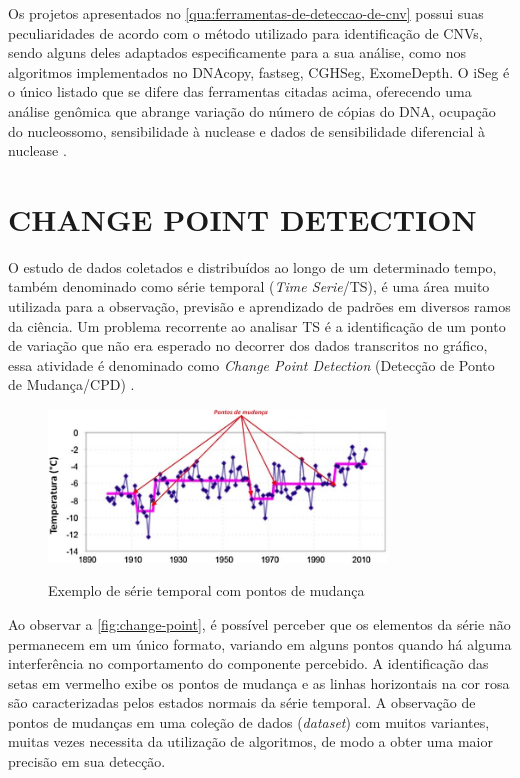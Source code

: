 Os projetos apresentados no \autoref{qua:ferramentas-de-deteccao-de-cnv} possui suas peculiaridades de acordo com o método utilizado para identificação de CNVs, sendo alguns deles adaptados especificamente para a sua análise, como nos algoritmos implementados no DNAcopy, fastseg, CGHSeg, ExomeDepth. O iSeg é o único listado que se difere das ferramentas citadas acima, oferecendo uma análise genômica que abrange variação do número de cópias do DNA, ocupação do nucleossomo, sensibilidade à nuclease e dados de sensibilidade diferencial à nuclease \cite{Girimurugan2018}.

\section{CHANGE POINT DETECTION}
\label{sec:changePointDetection}

O estudo de dados coletados e distribuídos ao longo de um determinado tempo, também denominado como série temporal (\textit{Time Serie}/TS), é uma área muito utilizada para a observação, previsão e aprendizado de padrões em diversos ramos da ciência. Um problema recorrente ao analisar TS é a identificação de um ponto de variação que não era esperado no decorrer dos dados transcritos no gráfico, essa atividade é denominado como \textit{Change Point Detection} (Detecção de Ponto de Mudança/CPD) \cite{Aminikhanghahi2017}.

\begin{figure}[!htb]
    \centering
    \caption{Exemplo de série temporal com pontos de mudança}
    \includegraphics[width=0.8\textwidth]{./dados/figuras/pontos-de-mudanca}
    \label{fig:change-point}
\end{figure}

Ao observar a \autoref{fig:change-point}, é possível perceber que os elementos da série não permanecem em um único formato, variando em alguns pontos quando há alguma interferência no comportamento do componente percebido. A identificação das setas em vermelho exibe os pontos de mudança e as linhas horizontais na cor rosa são caracterizadas pelos estados normais da série temporal. A observação de pontos de mudanças em uma coleção de dados (\textit{dataset}) com muitos variantes, muitas vezes necessita da utilização de algoritmos, de modo a obter uma maior precisão em sua detecção.


